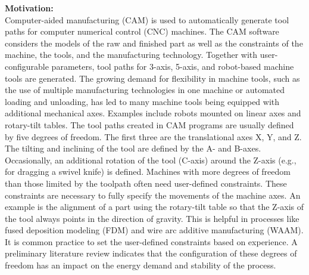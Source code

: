 \vspace{5mm}
\textbf{Motivation:}\\
Computer-aided manufacturing (CAM) is used to automatically generate tool paths for computer numerical control (CNC) machines. The CAM software considers the models of the raw and finished part as well as the constraints of the machine, the tools, and the manufacturing technology. Together with user-configurable parameters, tool paths for 3-axis, 5-axis, and robot-based machine tools are generated. The growing demand for flexibility in machine tools, such as the use of multiple manufacturing technologies in one machine or automated loading and unloading, has led to many machine tools being equipped with additional mechanical axes. Examples include robots mounted on linear axes and rotary-tilt tables.
The tool paths created in CAM programs are usually defined by five degrees of freedom. The first three are the translational axes X, Y, and Z. The tilting and inclining of the tool are defined by the A- and B-axes. Occasionally, an additional rotation of the tool (C-axis) around the Z-axis (e.g., for dragging a swivel knife) is defined. Machines with more degrees of freedom than those limited by the toolpath often need user-defined constraints. These constraints are necessary to fully specify the movements of the machine axes. An example is the alignment of a part using the rotary-tilt table so that the Z-axis of the tool always points in the direction of gravity. This is helpful in processes like fused deposition modeling (FDM) and wire arc additive manufacturing (WAAM). 
It is common practice to set the user-defined constraints based on experience. A preliminary literature review indicates that the configuration of these degrees of freedom has an impact on the energy demand and stability of the process.


